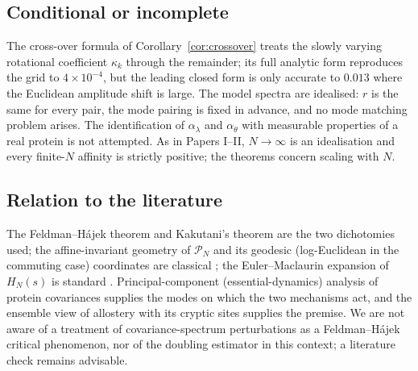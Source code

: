 \documentclass[11pt,reqno]{amsart}
\theoremstyle{plain}
\theoremstyle{definition}
\theoremstyle{remark}
\numberwithin{equation}{section}
\newcommand{\PN}{\mathcal{P}_N}
\begin{document}
\subsection*{Conditional or incomplete}
The cross-over formula of Corollary~\ref{cor:crossover} treats the slowly varying rotational coefficient $\kappa_k$ through the remainder; its full analytic form reproduces the grid to $4\times10^{-4}$, but the leading closed form is only accurate to $0.013$ where the Euclidean amplitude shift is large. The model spectra are idealised: $r$ is the same for every pair, the mode pairing is fixed in advance, and no mode matching problem arises. The identification of $\alpha_\lambda$ and $\alpha_\theta$ with measurable properties of a real protein is not attempted. As in Papers I--II, $N\to\infty$ is an idealisation and every finite-$N$ affinity is strictly positive; the theorems concern scaling with $N$.

\subsection*{Relation to the literature}
The Feldman--H\'ajek theorem \cite{Feldman1958,Hajek1958} and Kakutani's theorem \cite{Kakutani1948} are the two dichotomies used; the affine-invariant geometry of $\PN$ and its geodesic (log-Euclidean in the commuting case) coordinates are classical \cite{Bhatia2007,Pennec2006}; the Euler--Maclaurin expansion of $H_N(s)$ is standard \cite{Apostol1999,Titchmarsh1986}. Principal-component (essential-dynamics) analysis of protein covariances \cite{Amadei1993} supplies the modes on which the two mechanisms act, and the ensemble view of allostery with its cryptic sites \cite{Bowman2012,Motlagh2014,Nussinov2013} supplies the premise. We are not aware of a treatment of covariance-spectrum perturbations as a Feldman--H\'ajek critical phenomenon, nor of the doubling estimator in this context; a literature check remains advisable.
\end{document}
